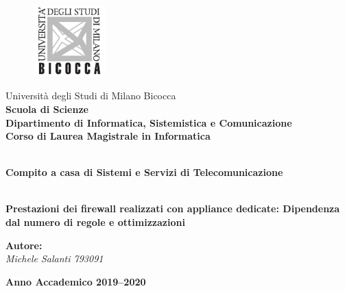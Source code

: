 \begin{titlepage}
\begin{onehalfspace}
	\begin{figure}
		\vspace*{-7mm}
		\centering
		\includegraphics[width=0.25\textwidth]{img/logo_unimib.pdf}
	\end{figure}
	\par
	\noindent Università degli Studi di Milano Bicocca \\
	\textbf{Scuola di Scienze \\
			Dipartimento di Informatica, Sistemistica e Comunicazione \\
			Corso di Laurea Magistrale in Informatica}
\end{onehalfspace}

\vfill
\par

\begin{doublespace}
\begin{center}
	{\Huge \textbf{\\Compito a casa di Sistemi e Servizi di Telecomunicazione}}
\end{center}
\begin{center}
	{\Large \textbf{\\Prestazioni dei firewall realizzati con appliance dedicate: Dipendenza dal numero di regole e ottimizzazioni}}
\end{center}
\end{doublespace}

\vfill
\par

\begin{onehalfspace}

\vspace{8mm}
\par

\begin{flushright}
	{\large \textbf{Autore:} \\
			\textit{Michele Salanti 793091}
	}
\end{flushright}
\end{onehalfspace}

\vfill
\par

\begin{center}
	{\large \textbf{Anno Accademico 2019--2020}}
\end{center}

\end{titlepage}
